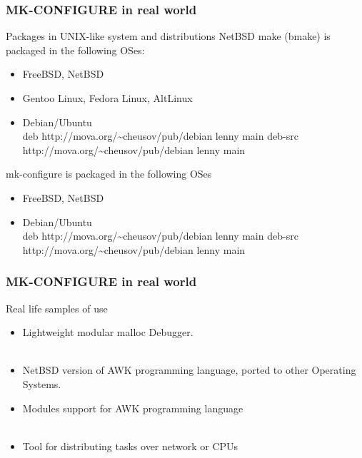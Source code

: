 \documentclass[hyperref={colorlinks=true}]{beamer}
\begin{document}

\begin{frame}[fragile,t]
  \frametitle{MK-CONFIGURE in real world}
  \begin{block}{Packages in UNIX-like system and distributions}
    NetBSD make (bmake) is packaged in the following OSes:
    \begin{itemize}
    \item FreeBSD, NetBSD
    \item Gentoo Linux, Fedora Linux, AltLinux
    \item Debian/Ubuntu\\
      deb http://mova.org/\~{}cheusov/pub/debian lenny main
      deb-src http://mova.org/\~{}cheusov/pub/debian lenny main
    \end{itemize}
    mk-configure is packaged in the following OSes
    \begin{itemize}
    \item FreeBSD, NetBSD
    \item Debian/Ubuntu\\
      deb http://mova.org/\~{}cheusov/pub/debian lenny main
      deb-src http://mova.org/\~{}cheusov/pub/debian lenny main
    \end{itemize}
  \end{block}
\end{frame}


\begin{frame}[fragile,t]
  \frametitle{MK-CONFIGURE in real world}
  \begin{block}{Real life samples of use}
  \begin{itemize}
  \item Lightweight modular malloc Debugger.\\
    \\
  \item NetBSD version of AWK programming language, ported
    to other Operating Systems.\\
  \item Modules support for AWK programming language\\
    \\
  \item Tool for distributing tasks over network or CPUs\\
    \\
  \end{itemize}
  \end{block}
\end{frame}
\end{document}
